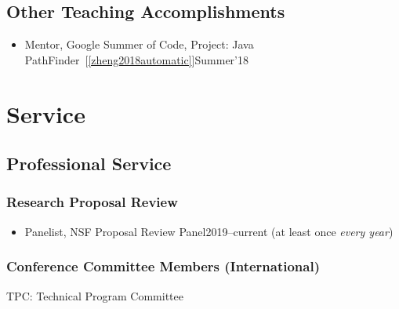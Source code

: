 \documentclass[11pt]{article}
\begin{document}
    \subsection{Other Teaching Accomplishments}
    \begin{itemize}
      \item Mentor, Google Summer of Code, Project: Java PathFinder~[\ref{zheng2018automatic}]\hfill Summer'18
    \end{itemize}

    \section{Service}
    \subsection{Professional Service}

    \subsubsection{Research Proposal Review}
    \begin{itemize}
      \item Panelist, NSF Proposal Review Panel\hfill 2019--current (at least once \emph{every year})
    \end{itemize}

    \subsubsection{Conference Committee Members (International)}

    \begin{description}[before=\small]
      \item TPC: Technical Program Committee
    \end{description}
\end{document}

